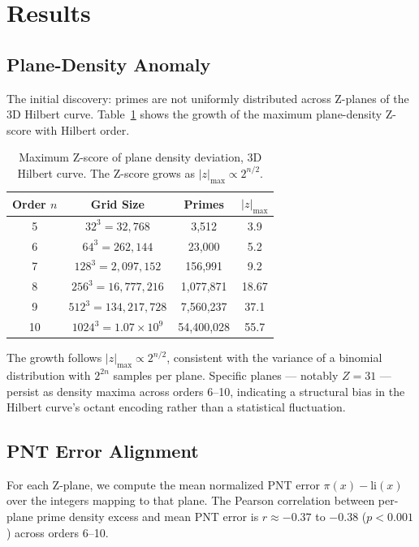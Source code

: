 \documentclass[11pt,a4paper]{article}
\begin{document}
\section{Results}

\subsection{Plane-Density Anomaly}
\label{sec:plane-anomaly}

The initial discovery: primes are not uniformly distributed across
Z-planes of the 3D Hilbert curve. Table~\ref{tab:plane-anomaly} shows the
growth of the maximum plane-density Z-score with Hilbert order.

\begin{table}[h]
\centering
\begin{tabular}{cccc}
\toprule
Order $n$ & Grid Size & Primes & $|z|_{\max}$ \\
\midrule
5  & $32^3 = 32,768$      & 3,512      & 3.9   \\
6  & $64^3 = 262,144$     & 23,000     & 5.2   \\
7  & $128^3 = 2,097,152$  & 156,991    & 9.2   \\
8  & $256^3 = 16,777,216$ & 1,077,871  & 18.67 \\
9  & $512^3 = 134,217,728$& 7,560,237  & 37.1  \\
10 & $1024^3 = 1.07 \times 10^9$ & 54,400,028 & 55.7 \\
\bottomrule
\end{tabular}
\caption{Maximum Z-score of plane density deviation, 3D Hilbert curve.
The Z-score grows as $|z|_{\max} \propto 2^{n/2}$.}
\label{tab:plane-anomaly}
\end{table}

The growth follows $|z|_{\max} \propto 2^{n/2}$, consistent with the
variance of a binomial distribution with $2^{2n}$ samples per plane.
Specific planes --- notably $Z = 31$ --- persist as density maxima across
orders 6--10, indicating a structural bias in the Hilbert curve's octant
encoding rather than a statistical fluctuation.

\subsection{PNT Error Alignment}
\label{sec:pnt-alignment}

For each Z-plane, we compute the mean normalized PNT error $\pi(x) -
\text{li}(x)$ over the integers mapping to that plane. The Pearson
correlation between per-plane prime density excess and mean PNT error is
$r \approx -0.37$ to $-0.38$ ($p < 0.001$) across orders 6--10.
\end{document}
